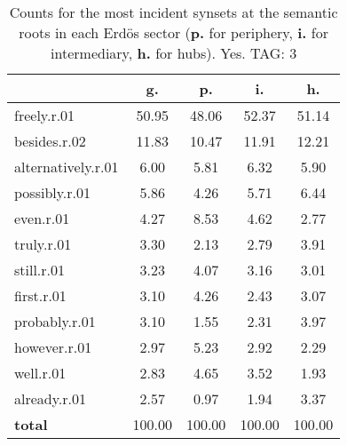 \begin{table}[h!]
\begin{center}
\begin{tabular}{| l | c | c | c | c |}\hline
 & g. & p. & i. & h. \\\hline
freely.r.01 & 50.95  & 48.06  & 52.37  & 51.14 \\\hline
besides.r.02 & 11.83  & 10.47  & 11.91  & 12.21 \\\hline
alternatively.r.01 & 6.00  & 5.81  & 6.32  & 5.90 \\\hline
possibly.r.01 & 5.86  & 4.26  & 5.71  & 6.44 \\\hline
even.r.01 & 4.27  & 8.53  & 4.62  & 2.77 \\\hline
truly.r.01 & 3.30  & 2.13  & 2.79  & 3.91 \\\hline
still.r.01 & 3.23  & 4.07  & 3.16  & 3.01 \\\hline
first.r.01 & 3.10  & 4.26  & 2.43  & 3.07 \\\hline
probably.r.01 & 3.10  & 1.55  & 2.31  & 3.97 \\\hline
however.r.01 & 2.97  & 5.23  & 2.92  & 2.29 \\\hline
well.r.01 & 2.83  & 4.65  & 3.52  & 1.93 \\\hline
already.r.01 & 2.57  & 0.97  & 1.94  & 3.37 \\\hline
{{\bf total}} & 100.00  & 100.00  & 100.00  & 100.00 \\\hline
\end{tabular}
\caption{Counts for the most incident synsets at the semantic roots in each Erd\"os sector ({\bf p.} for periphery, {\bf i.} for intermediary, {\bf h.} for hubs). Yes. TAG: 3}
\end{center}
\end{table}